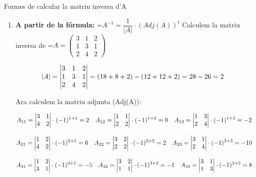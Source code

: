 \documentclass[11pt,a4paper]{article}
\newcommand{\fmm}[1]{\setbox0=\hbox{$#1$}\ifdim\wd0>\linewidth\fmdisp{#1}\else\mbox{\box0}\fi}
\newcommand{\fmdisp}[1]{\[\setbox2=\hbox{$\displaystyle #1$}\ifdim\wd2>\linewidth\resizebox{\linewidth}{!}{\box2}\else\box2\fi\]}
\begin{document}
\begin{fmex}{Formes de calcular la matriu inversa d'A}
\begin{enumerate}[label=\textbf{\arabic*.},leftmargin=*]
Aleshores:

\fmdisp{\boxed{A^{-1}=\begin{pmatrix}-5 & 2\\ 3 & -1\end{pmatrix}}}

\item \textbf{A partir de la fórmula:} \fmm{A^{-1}=\dfrac{1}{|A|}\cdot(Adj(A))^t}\newline
          Calculem la matriu inversa de \fmm{A=\begin{pmatrix}3 & 1 & 2\\ 1 & 3 & 1\\ 2 & 4 & 2\end{pmatrix}}

\fmdisp{|A|=\begin{vmatrix}3 & 1 & 2\\ 1 & 3 & 1\\ 2 & 4 & 2\end{vmatrix}=(18+8+2)-(12+12+2)=28-26=2}

Ara calculem la matriu adjunta (Adj(A)):

\fmdisp{A_{11}=\begin{vmatrix}3 & 1\\ 4 & 2\end{vmatrix}\cdot(-1)^{1+1}=2\quad A_{12}=\begin{vmatrix}1 & 1\\ 2 & 2\end{vmatrix}\cdot(-1)^{1+2}=0\quad A_{13}=\begin{vmatrix}1 & 3\\ 2 & 4\end{vmatrix}\cdot(-1)^{1+3}=-2}

\fmdisp{A_{21}=\begin{vmatrix}1 & 2\\ 4 & 2\end{vmatrix}\cdot(-1)^{2+1}=6\quad A_{22}=\begin{vmatrix}3 & 2\\ 2 & 2\end{vmatrix}\cdot(-1)^{2+2}=2\quad A_{23}=\begin{vmatrix}3 & 1\\ 2 & 4\end{vmatrix}\cdot(-1)^{2+3}=-10}

\fmdisp{A_{31}=\begin{vmatrix}1 & 2\\ 3 & 1\end{vmatrix}\cdot(-1)^{3+1}=-5\quad A_{32}=\begin{vmatrix}3 & 2\\ 1 & 1\end{vmatrix}\cdot(-1)^{3+2}=-1\quad A_{33}=\begin{vmatrix}3 & 1\\ 1 & 3\end{vmatrix}\cdot(-1)^{3+3}=8}


\end{enumerate}
\end{fmex}
\end{document}
